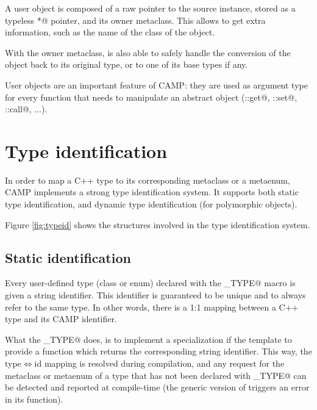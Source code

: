 \documentclass[a4paper, twoside]{report}
\begin{document}
	A user object is composed of a raw pointer to the source instance, stored as a typeless \verb@void*@ pointer,
	and its owner metaclass. This allows to get extra information, such as the name of the class of the object.
	
	With the owner metaclass, \verb@UserObject@ is also able to safely handle the conversion of the object back to its original type,
	or to one of its base types if any.
	
	User objects are an important feature of CAMP: they are used as argument type for every function that needs to manipulate
	an abstract object (\verb@Property::get@, \verb@Property::set@, \verb@Function::call@, ...).


\chapter{Type identification}
\label{sec:identification}

	In order to map a C++ type to its corresponding metaclass or a metaenum, CAMP implements a strong
	type identification system. It supports both static type identification, and	dynamic type identification
	(for polymorphic objects).

	Figure \ref{fig:typeid} shows the structures involved in the type identification system.


\section{Static identification}
	
	Every user-defined type (class or enum) declared with the \verb@CAMP_TYPE@
	macro is given a string identifier. This identifier is guaranteed to
	be unique and to always refer to the same type. In other words, there is a 1:1
	mapping between a C++ type and its CAMP identifier.
	
	What the \verb@CAMP_TYPE@ does, is to implement a specialization if the \verb@StaticTypeId@ template
	to provide a \verb@get@ function which returns the corresponding string identifier.
	This way, the type$\Leftrightarrow$id mapping is resolved during compilation, and any request for the metaclass
	or metaenum of a type that has not been declared with \verb@CAMP_TYPE@ can be detected and reported
	at compile-time (the generic version of \verb@StaticTypeId@ triggers an error in its \verb@get@ function).
	
\end{document}
